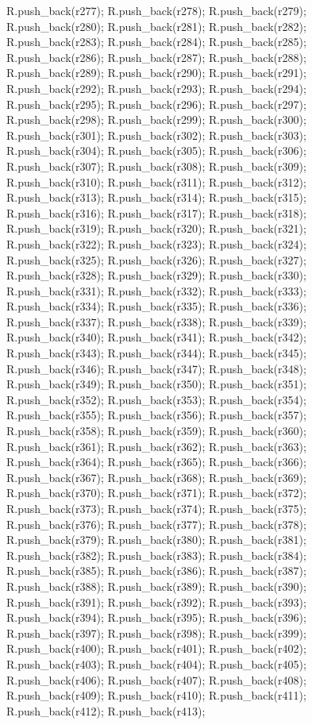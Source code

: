 \begin{DoxyCode}
{R.push_back(r277);
R.push_back(r278);
R.push_back(r279);
R.push_back(r280);
R.push_back(r281);
R.push_back(r282);
R.push_back(r283);
R.push_back(r284);
R.push_back(r285);
R.push_back(r286);
R.push_back(r287);
R.push_back(r288);
R.push_back(r289);
R.push_back(r290);
R.push_back(r291);
R.push_back(r292);
R.push_back(r293);
R.push_back(r294);
R.push_back(r295);
R.push_back(r296);
R.push_back(r297);
R.push_back(r298);
R.push_back(r299);
R.push_back(r300);
R.push_back(r301);
R.push_back(r302);
R.push_back(r303);
R.push_back(r304);
R.push_back(r305);
R.push_back(r306);
R.push_back(r307);
R.push_back(r308);
R.push_back(r309);
R.push_back(r310);
R.push_back(r311);
R.push_back(r312);
R.push_back(r313);
R.push_back(r314);
R.push_back(r315);
R.push_back(r316);
R.push_back(r317);
R.push_back(r318);
R.push_back(r319);
R.push_back(r320);
R.push_back(r321);
R.push_back(r322);
R.push_back(r323);
R.push_back(r324);
R.push_back(r325);
R.push_back(r326);
R.push_back(r327);
R.push_back(r328);
R.push_back(r329);
R.push_back(r330);
R.push_back(r331);
R.push_back(r332);
R.push_back(r333);
R.push_back(r334);
R.push_back(r335);
R.push_back(r336);
R.push_back(r337);
R.push_back(r338);
R.push_back(r339);
R.push_back(r340);
R.push_back(r341);
R.push_back(r342);
R.push_back(r343);
R.push_back(r344);
R.push_back(r345);
R.push_back(r346);
R.push_back(r347);
R.push_back(r348);
R.push_back(r349);
R.push_back(r350);
R.push_back(r351);
R.push_back(r352);
R.push_back(r353);
R.push_back(r354);
R.push_back(r355);
R.push_back(r356);
R.push_back(r357);
R.push_back(r358);
R.push_back(r359);
R.push_back(r360);
R.push_back(r361);
R.push_back(r362);
R.push_back(r363);
R.push_back(r364);
R.push_back(r365);
R.push_back(r366);
R.push_back(r367);
R.push_back(r368);
R.push_back(r369);
R.push_back(r370);
R.push_back(r371);
R.push_back(r372);
R.push_back(r373);
R.push_back(r374);
R.push_back(r375);
R.push_back(r376);
R.push_back(r377);
R.push_back(r378);
R.push_back(r379);
R.push_back(r380);
R.push_back(r381);
R.push_back(r382);
R.push_back(r383);
R.push_back(r384);
R.push_back(r385);
R.push_back(r386);
R.push_back(r387);
R.push_back(r388);
R.push_back(r389);
R.push_back(r390);
R.push_back(r391);
R.push_back(r392);
R.push_back(r393);
R.push_back(r394);
R.push_back(r395);
R.push_back(r396);
R.push_back(r397);
R.push_back(r398);
R.push_back(r399);
R.push_back(r400);
R.push_back(r401);
R.push_back(r402);
R.push_back(r403);
R.push_back(r404);
R.push_back(r405);
R.push_back(r406);
R.push_back(r407);
R.push_back(r408);
R.push_back(r409);
R.push_back(r410);
R.push_back(r411);
R.push_back(r412);
R.push_back(r413);
}
\end{DoxyCode}
